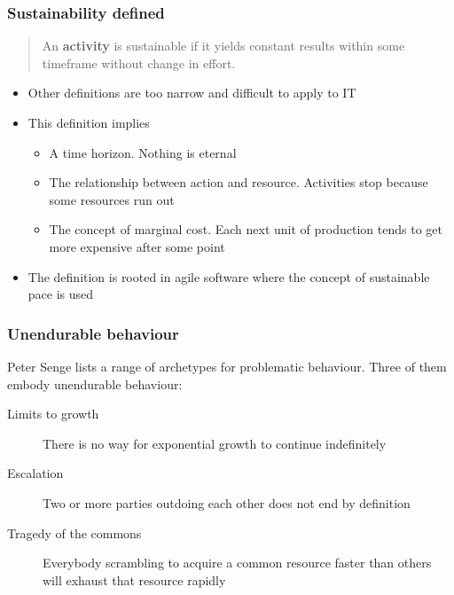 \begin{frame}[fragile]
  \frametitle{Sustainability defined}
  \begin{center}
  	\begin{quote}
		An \textbf{activity} is sustainable if it yields constant results within some timeframe without change in effort.
	\end{quote}
  \end{center}

	\begin{itemize}
		\item Other definitions are too narrow and difficult to apply to IT
		\item This definition implies 
		\begin{itemize}
			\item A time horizon. Nothing is eternal
			\item The relationship between action and resource. Activities stop because some resources run out
			\item The concept of marginal cost. Each next unit of production tends to get more expensive after some point
		\end{itemize}
		
		\item The definition is rooted in agile software \citep{sustainable} where the concept of sustainable pace is used
	\end{itemize}
\end{frame}

\begin{frame}[fragile]
  \frametitle{Unendurable behaviour}
  	Peter Senge \citep{senge19905th} lists a range of archetypes for problematic behaviour. Three of them embody unendurable behaviour:
	
	\begin{description}
		\item[Limits to growth] There is no way for exponential growth to continue indefinitely
		\item[Escalation] Two or more parties outdoing each other does not end by definition
		\item[Tragedy of the commons] Everybody scrambling to acquire a common resource faster than others will exhaust that resource rapidly
	\end{description}	
\end{frame}

